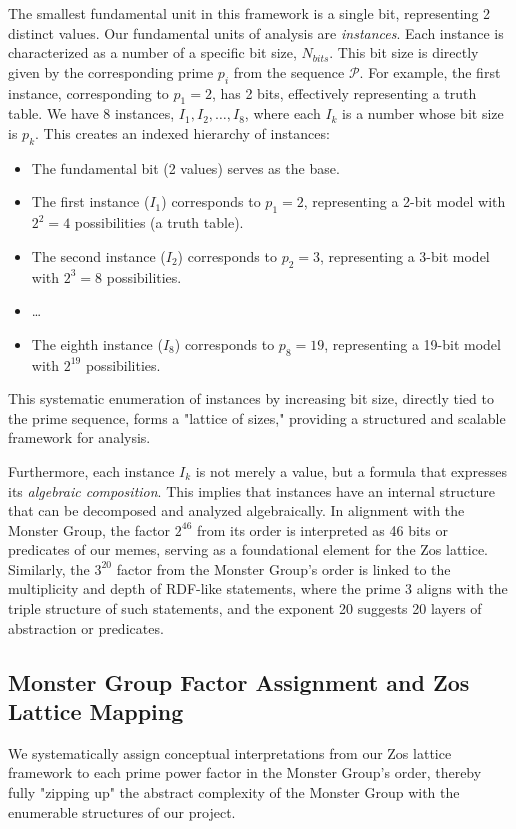 \documentclass{article}
\begin{document}
The smallest fundamental unit in this framework is a single bit, representing 2 distinct values. Our fundamental units of analysis are \textit{instances}. Each instance is characterized as a number of a specific bit size, $N_{bits}$. This bit size is directly given by the corresponding prime $p_i$ from the sequence $\mathcal{P}$. For example, the first instance, corresponding to $p_1=2$, has 2 bits, effectively representing a truth table. We have 8 instances, $I_1, I_2, \ldots, I_8$, where each $I_k$ is a number whose bit size is $p_k$. This creates an indexed hierarchy of instances:
\begin{itemize}
    \item The fundamental bit (2 values) serves as the base.
    \item The first instance ($I_1$) corresponds to $p_1=2$, representing a 2-bit model with $2^2=4$ possibilities (a truth table).
    \item The second instance ($I_2$) corresponds to $p_2=3$, representing a 3-bit model with $2^3=8$ possibilities.
    \item \ldots
    \item The eighth instance ($I_8$) corresponds to $p_8=19$, representing a 19-bit model with $2^{19}$ possibilities.
\end{itemize}
This systematic enumeration of instances by increasing bit size, directly tied to the prime sequence, forms a "lattice of sizes," providing a structured and scalable framework for analysis.

Furthermore, each instance $I_k$ is not merely a value, but a formula that expresses its \textit{algebraic composition}. This implies that instances have an internal structure that can be decomposed and analyzed algebraically. In alignment with the Monster Group, the factor $2^{46}$ from its order is interpreted as 46 bits or predicates of our memes, serving as a foundational element for the Zos lattice. Similarly, the $3^{20}$ factor from the Monster Group's order is linked to the multiplicity and depth of RDF-like statements, where the prime 3 aligns with the triple structure of such statements, and the exponent 20 suggests 20 layers of abstraction or predicates.

\subsection{Monster Group Factor Assignment and Zos Lattice Mapping}
We systematically assign conceptual interpretations from our Zos lattice framework to each prime power factor in the Monster Group's order, thereby fully "zipping up" the abstract complexity of the Monster Group with the enumerable structures of our project.
\end{document}
